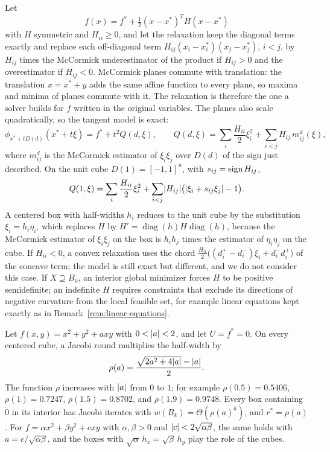 Let
\[
  f(x)=f^*+\tfrac12(x-x^*)^TH(x-x^*)
\]
with $H$ symmetric and $H_{ii}\ge0$, and let the relaxation keep the
diagonal terms exactly and replace each off-diagonal term
$H_{ij}(x_i-x_i^*)(x_j-x_j^*)$, $i<j$, by $H_{ij}$ times the McCormick
underestimator of the product if $H_{ij}>0$ and the overestimator if
$H_{ij}<0$. McCormick planes commute with translation: the translation
$x=x^*+y$ adds the same affine function to every plane, so maxima and minima
of planes commute with it. The relaxation is therefore the one a solver
builds for $f$ written in the original variables. The planes also scale
quadratically, so the tangent model is exact:
\begin{equation}\label{eq:quadratic-Q}
  \phi_{x^*+tD(d)}(x^*+t\xi)=f^*+t^2Q(d,\xi),\qquad
  Q(d,\xi)=\sum_i\frac{H_{ii}}{2}\xi_i^2+\sum_{i<j}H_{ij}\,m_{ij}^d(\xi),
\end{equation}
where $m_{ij}^d$ is the McCormick estimator of $\xi_i\xi_j$ over $D(d)$ of
the sign just described. On the unit cube $D(1)=[-1,1]^n$, with
$s_{ij}=\operatorname{sign} H_{ij}$,
\begin{equation}\label{eq:cube-Q}
  Q(1,\xi)=\sum_i\frac{H_{ii}}{2}\xi_i^2
  +\sum_{i<j}\lvert H_{ij}\rvert\bigl(\lvert \xi_i+s_{ij}\xi_j\rvert-1\bigr).
\end{equation}
A centered box with half-widths $h_i$ reduces to the unit cube by the
substitution $\xi_i=h_i\eta_i$, which replaces $H$ by
$H'=\operatorname{diag}(h)H\operatorname{diag}(h)$, because the McCormick
estimator of $\xi_i\xi_j$ on the box is $h_ih_j$ times the estimator of
$\eta_i\eta_j$ on the cube. If $H_{ii}<0$, a convex relaxation uses the chord
$\frac{H_{ii}}{2}\bigl((d_i^+-d_i^-)\xi_i+d_i^-d_i^+\bigr)$ of the concave
term; the model is still exact but different, and we do not consider this
case. If $X\supseteq B_0$, an interior global minimizer forces $H$ to be
positive semidefinite; an indefinite $H$ requires constraints that exclude
its directions of negative curvature from the local feasible set, for
example linear equations kept exactly as in
Remark~\ref{rem:linear-equations}.

\begin{proposition}\label{prop:two-variable-rate}
Let $f(x,y)=x^2+y^2+axy$ with $0<\lvert a\rvert<2$, and let $U=f^*=0$. On every
centered cube, a Jacobi round multiplies the half-width by
\[
  \rho(a)=\frac{\sqrt{2a^2+4\lvert a\rvert}-\lvert a\rvert}{2}.
\]
The function $\rho$ increases with $\lvert a\rvert$ from $0$ to $1$; for example
$\rho(0.5)=0.5406$, $\rho(1)=0.7247$, $\rho(1.5)=0.8702$, and
$\rho(1.9)=0.9748$. Every box containing $0$ in its interior has Jacobi
iterates with $w(B_k)=\Theta(\rho(a)^k)$, and $r^*=\rho(a)$. For
$f=\alpha x^2+\beta y^2+cxy$ with $\alpha,\beta>0$ and
$\lvert c\rvert<2\sqrt{\alpha\beta}$, the same holds with $a=c/\sqrt{\alpha\beta}$,
and the boxes with $\sqrt\alpha\,h_x=\sqrt\beta\,h_y$ play the role of the
cubes.
\end{proposition}

